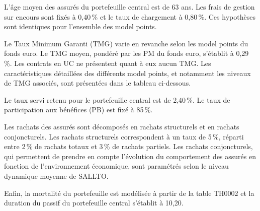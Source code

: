 L'âge moyen des assurés du portefeuille central est de 63 ans. Les frais de gestion sur encours sont fixés à 0,40\,\% et le taux de chargement à 0,80\,\%. Ces hypothèses sont identiques pour l'ensemble des model points.

Le Taux Minimum Garanti (TMG) varie en revanche selon les model points du fonds euro. Le TMG moyen, pondéré par les PM du fonds euro, s'établit à 0,29\,\%. Les contrats en UC ne présentent quant à eux aucun TMG. Les caractéristiques détaillées des différents model points, et notamment les niveaux de TMG associés, sont présentées dans le tableau ci-dessous.


Le taux servi retenu pour le portefeuille central est de 2,40\,\%. Le taux de participation aux bénéfices (PB) est fixé à 85\,\%.

Les rachats des assurés sont décomposés en rachats structurels et en rachats conjoncturels. Les rachats structurels correspondent à un taux de 5\,\%, réparti entre 2\,\% de rachats totaux et 3\,\% de rachats partiels. Les rachats conjoncturels, qui permettent de prendre en compte l'évolution du comportement des assurés en fonction de l'environnement économique, sont paramétrés selon le niveau \og dynamique moyenne \fg{} de SALLTO.

Enfin, la mortalité du portefeuille est modélisée à partir de la table TH0002 et la duration du passif du portefeuille central s'établit à 10,20.

